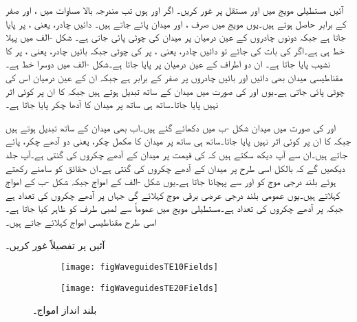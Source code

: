 آئیں مستطیلی مویج میں   اور  مستقل پر غور کریں۔ اگر  اور  ہوں تب مندرجہ بالا مساوات میں ،  اور  صفر کے برابر حاصل ہوتے ہیں۔یوں مویج میں صرف ،  اور  میدان پائے جاتے ہیں۔ دائیں چادر، یعنی ، پر  پایا جاتا ہے جبکہ دونوں چادروں کے عین درمیان  پر میدان کی چوٹی پائی جاتی ہے۔ شکل -الف میں پہلا خط  ہی ہے۔اگر  کی بات کی جائے تو دائیں چادر، یعنی ، پر  کی چوٹی جبکہ بائیں چادر، یعنی ، پر  کا نشیب پایا جاتا ہے۔ ان دو اطراف کے عین درمیان  پر  پایا جاتا ہے۔شکل -الف میں دوسرا خط  ہے۔مقناطیسی میدان  بھی دائیں اور بائیں چادروں پر صفر کے برابر ہے جبکہ ان کے عین درمیان اس کی چوٹی پائی جاتی ہے۔یوں  اور  کی صورت میں میدان  کے ساتھ تبدیل ہوتے ہیں جبکہ  کا ان پر کوئی اثر نہیں پایا جاتا۔ساتھ ہی ساتھ  پر میدان کا آدھا چکر پایا جاتا ہے۔ 

 اور  کی صورت میں میدان شکل -ب  میں دکھائے گئے ہیں۔اب بھی میدان  کے ساتھ تبدیل ہوتے ہیں جبکہ  کا ان پر کوئی اثر نہیں پایا جاتا۔ساتھ ہی ساتھ  پر میدان کا مکمل چکر، یعنی دو آدھے چکر، پائے جاتے ہیں۔ان سے آپ دیکھ سکتے ہیں کہ  کی قیمت  پر میدان کے آدھے چکروں کی گنتی ہے۔آپ جلد دیکھیں گے کہ  بالکل اسی طرح  پر میدان کے آدھے چکروں کی گنتی ہے۔ان حقائق کو سامنے رکھتے ہوئے بلند درجی  موج کو  اور  سے پہچانا جاتا ہے۔یوں شکل -الف کے امواج   جبکہ شکل -ب کے امواج  کہلاتے ہیں۔یوں عمومی بلند درجی عرضی برقی موج  کہلائے گی جہاں  پر آدھے چکروں کی تعداد  ہے جبکہ  پر آدھے چکروں کی تعداد  ہے۔مستطیلی مویج میں عموماً  سے لمبی طرف کو ظاہر کیا جاتا ہے۔اسی طرح مقناطیسی امواج  کہلائے جاتے ہیں۔

آئیں  پر تفصیلاً غور کریں۔


\begin{figure}
\centering
\begin{subfigure}{0.5\textwidth}
\centering
\texttt{[image: figWaveguidesTE10Fields]}
\end{subfigure}%
%
\begin{subfigure}{0.5\textwidth}
\centering
\texttt{[image: figWaveguidesTE20Fields]}
\end{subfigure}%
\caption{بلند  انداز  امواج۔}
\label{شکل_مویج_بلند_ایک_صفر_دو_صفر}
\end{figure}

